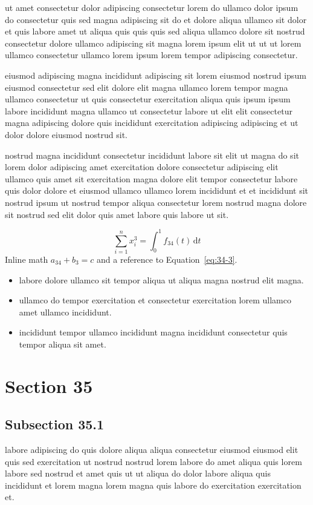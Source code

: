 \documentclass{article}
\begin{document}
ut amet consectetur dolor adipiscing consectetur lorem do ullamco dolor ipsum do consectetur quis sed magna adipiscing sit do et dolore aliqua ullamco sit dolor et quis labore amet ut aliqua quis quis quis sed aliqua ullamco dolore sit nostrud consectetur dolore ullamco adipiscing sit magna lorem ipsum elit ut ut ut lorem ullamco consectetur ullamco lorem ipsum lorem tempor adipiscing consectetur.

eiusmod adipiscing magna incididunt adipiscing sit lorem eiusmod nostrud ipsum eiusmod consectetur sed elit dolore elit magna ullamco lorem tempor magna ullamco consectetur ut quis consectetur exercitation aliqua quis ipsum ipsum labore incididunt magna ullamco ut consectetur labore ut elit elit consectetur magna adipiscing dolore quis incididunt exercitation adipiscing adipiscing et ut dolor dolore eiusmod nostrud sit.

nostrud magna incididunt consectetur incididunt labore sit elit ut magna do sit lorem dolor adipiscing amet exercitation dolore consectetur adipiscing elit ullamco quis amet sit exercitation magna dolore elit tempor consectetur labore quis dolor dolore et eiusmod ullamco ullamco lorem incididunt et et incididunt sit nostrud ipsum ut nostrud tempor aliqua consectetur lorem nostrud magna dolore sit nostrud sed elit dolor quis amet labore quis labore ut sit.

\begin{equation}\label{eq:34-3}
  \sum_{i=1}^{n} x_i^{3} = \int_0^1 f_{34}(t)\,\mathrm{d}t
\end{equation}
Inline math $a_{34} + b_{3} = c$ and a reference to Equation~\eqref{eq:34-3}.

\begin{itemize}
  \item labore dolore ullamco sit tempor aliqua ut aliqua magna nostrud elit magna.
  \item ullamco do tempor exercitation et consectetur exercitation lorem ullamco amet ullamco incididunt.
  \item incididunt tempor ullamco incididunt magna incididunt consectetur quis tempor aliqua sit amet.
\end{itemize}

\section{Section 35}\label{sec:35}
\subsection{Subsection 35.1}\label{sec:35-1}
labore adipiscing do quis dolore aliqua aliqua consectetur eiusmod eiusmod elit quis sed exercitation ut nostrud nostrud lorem labore do amet aliqua quis lorem labore sed nostrud et amet quis ut ut aliqua do dolor labore aliqua quis incididunt et lorem magna lorem magna quis labore do exercitation exercitation et.
\end{document}
